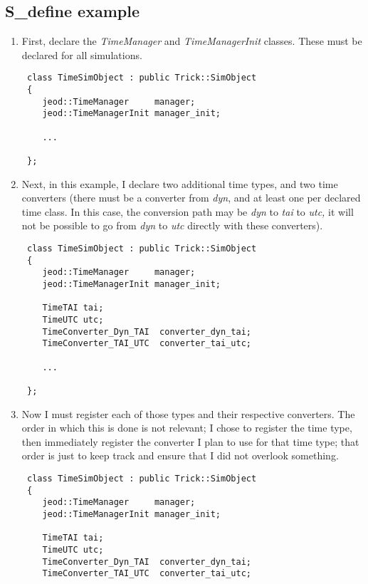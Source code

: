 \subsection{S\_define example}
\begin{enumerate}
\item First, declare the \textit{TimeManager} and \textit{TimeManagerInit} classes.  These
must be declared for all simulations.

\begin{verbatim}
 class TimeSimObject : public Trick::SimObject
 {
    jeod::TimeManager     manager;
    jeod::TimeManagerInit manager_init;

    ...

 };
\end{verbatim}



\item Next, in this example, I declare two additional time types, and two time converters
(there must be a converter from \textit{dyn}, and at least one per
declared time class.  In this case, the conversion path may be\textit{
dyn }to \textit{tai} to \textit{utc, }it will not be possible to go
from \textit{dyn }to \textit{utc }directly with these converters).

\begin{verbatim}
 class TimeSimObject : public Trick::SimObject
 {
    jeod::TimeManager     manager;
    jeod::TimeManagerInit manager_init;

    TimeTAI tai;
    TimeUTC utc;
    TimeConverter_Dyn_TAI  converter_dyn_tai;
    TimeConverter_TAI_UTC  converter_tai_utc;

    ...

 };
\end{verbatim}



\item Now I must register each of those types and their respective converters.
 The order in which this is done is not relevant; I chose to register
the time type, then immediately register the converter I plan to use for that time type; that order is just to keep track and ensure that I did not overlook
something.

\begin{verbatim}
 class TimeSimObject : public Trick::SimObject
 {
    jeod::TimeManager     manager;
    jeod::TimeManagerInit manager_init;

    TimeTAI tai;
    TimeUTC utc;
    TimeConverter_Dyn_TAI  converter_dyn_tai;
    TimeConverter_TAI_UTC  converter_tai_utc;


\end{verbatim}
\end{enumerate}
